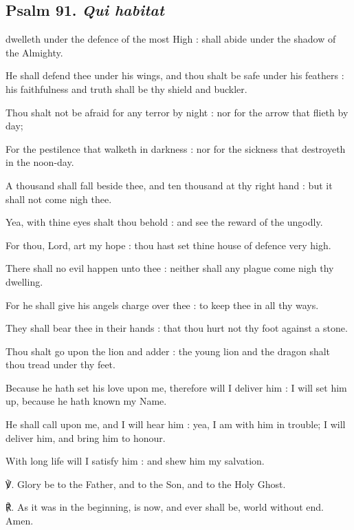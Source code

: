 \begin{multicols}{2}
\subsection{Psalm 91. \textit{Qui habitat}}
 dwelleth under the defence of the most High : shall abide under the shadow of the Almighty.\par
{}
He shall defend thee under his wings, and thou shalt be safe under his feathers : his faithfulness and truth shall be thy shield and buckler.\par
{}Thou shalt not be afraid for any terror by night : nor for the arrow that flieth by day;\par
{}For the pestilence that walketh in darkness : nor for the sickness that destroyeth in the noon-day.\par
{}A thousand shall fall beside thee, and ten thousand at thy right hand : but it shall not come nigh thee.\par
{}Yea, with thine eyes shalt thou behold : and see the reward of the ungodly.\par
{}For thou, Lord, art my hope : thou hast set thine house of defence very high.\par
{}There shall no evil happen unto thee : neither shall any plague come nigh thy dwelling.\par
{}For he shall give his angels charge over thee : to keep thee in all thy ways.\par
{}They shall bear thee in their hands : that thou hurt not thy foot against a stone.\par
{}Thou shalt go upon the lion and adder : the young lion and the dragon shalt thou tread under thy feet.\par
{}Because he hath set his love upon me, therefore will I deliver him : I will set him up, because he hath known my Name.\par
{}He shall call upon me, and I will hear him : yea, I am with him in trouble; I will deliver him, and bring him to honour.\par
{}With long life will I satisfy him : and shew him my salvation.\par
℣. Glory be to the Father, and to the Son, and to the Holy Ghost.\par
℟. As it was in the beginning, is now, and ever shall be, world without end. Amen.


\end{multicols}
